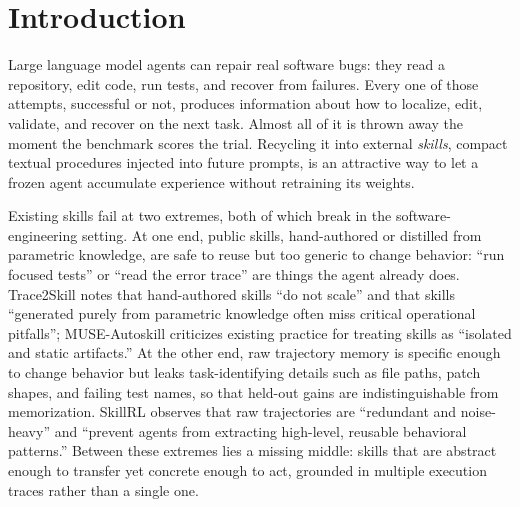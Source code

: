 \section{Introduction}

Large language model agents can repair real software bugs: they read a
repository, edit code, run tests, and recover from failures. Every one of those
attempts, successful or not, produces information about how to localize, edit,
validate, and recover on the next task. Almost all of it is thrown away the
moment the benchmark scores the trial. Recycling it into external
\emph{skills}, compact textual procedures injected into future prompts, is an
attractive way to let a frozen agent accumulate experience without retraining
its weights.

Existing skills fail at two extremes, both of which break in the
software-engineering setting. At one end, public skills, hand-authored or
distilled from parametric knowledge, are safe to reuse but too generic to
change behavior: ``run focused tests'' or ``read the error trace'' are things
the agent already does. Trace2Skill \citep{trace2skill2024} notes that
hand-authored skills ``do not scale'' and that skills ``generated purely from
parametric knowledge often miss critical operational pitfalls'';
MUSE-Autoskill \citep{museautoskill2026} criticizes existing practice for
treating skills as ``isolated and static artifacts.'' At the other end, raw
trajectory memory is specific enough to change behavior but leaks
task-identifying details such as file paths, patch shapes, and failing test
names, so that held-out gains are indistinguishable from memorization.
SkillRL \citep{skillrl2026} observes that raw trajectories are ``redundant and
noise-heavy'' and ``prevent agents from extracting high-level, reusable
behavioral patterns.'' Between these extremes lies a missing middle: skills
that are abstract enough to transfer yet concrete enough to act, grounded in
multiple execution traces rather than a single one.

